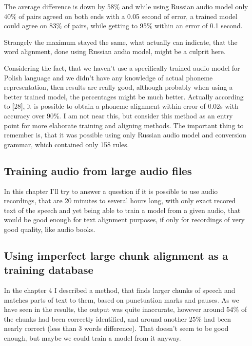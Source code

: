 \documentclass[12pt,a4paper,english]{article}
\begin{document}
\newpage

The average difference is down by 58\% and while using Russian audio model only 40\% of pairs agreed on both ends with a 0.05 second of error, a trained model could agree on 83\% of pairs, while getting to 95\% within an error of 0.1 second. \newline

Strangely the maximum stayed the same, what actually can indicate, that the word alignment, done using Russian audio model, might be a culprit here. \newline

Considering the fact, that we haven't use a specifically trained audio model for Polish language and we didn't have any knowledge of actual phoneme representation, then results are really good, although probably when using a better trained model, the percentages might be much better. \newline
Actually according to [28], it is possible to obtain a phoneme alignment within error of 0.02s with accuracy over 90\%. I am not near this, but consider this method as an entry point for more elaborate training and aligning methods. \newline
The important thing to remember is, that it was possible using only Russian audio model and conversion grammar, which contained only 158 rules. 

\newpage
\begin{center}
    \section{Training audio from large audio files}
\end {center}
\setcounter{equation}{0}

In this chapter I'll try to answer a question if it is possible to use audio recordings, that are 20 minutes to several hours long, with only exact recored text of the speech and yet being able to train a model from a given audio, that would be good enough for text alignment purposes, if only for recordings of very good quality, like audio books. \newline \newline

\subsection{Using imperfect large chunk alignment as a training database}

In the chapter 4 I described a method, that finds larger chunks of speech and matches parts of text to them, based on punctuation marks and pauses. As we have seen in the results, the output was quite inaccurate, however around 54\% of the chunks had been correctly identified, and around another 25\% had been nearly correct (less than 3 words difference). That doesn't seem to be good enough, but maybe we could train a model from it anyway. \newline
\end{document}
